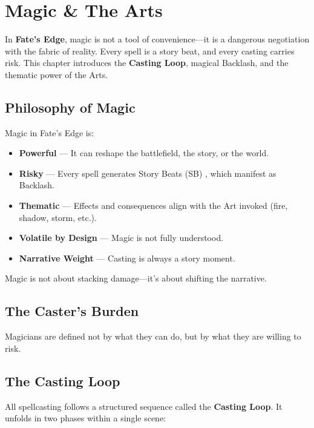 
\chapter{Magic \& The Arts}
\label{ch:magic}

In \textbf{Fate's Edge}, magic is not a tool of convenience—it is a dangerous negotiation with the fabric of reality. Every spell is a story beat, and every casting carries risk. This chapter introduces the \textbf{Casting Loop}, magical Backlash, and the thematic power of the Arts.

\section{Philosophy of Magic}

Magic in Fate's Edge is:

\begin{itemize}
  \item \textbf{Powerful} — It can reshape the battlefield, the story, or the world.
  \item \textbf{Risky} — Every spell generates Story Beats (SB) , which manifest as Backlash.
  \item \textbf{Thematic} — Effects and consequences align with the Art invoked (fire, shadow, storm, etc.).
  \item \textbf{Volatile by Design} — Magic is not fully understood.
  \item \textbf{Narrative Weight} — Casting is always a story moment.
\end{itemize}

Magic is not about stacking damage—it's about shifting the narrative.

\section{The Caster's Burden}

Magicians are defined not by what they can do, but by what they are willing to risk.

\section{The Casting Loop}

All spellcasting follows a structured sequence called the \textbf{Casting Loop}. It unfolds in two phases within a single scene:

